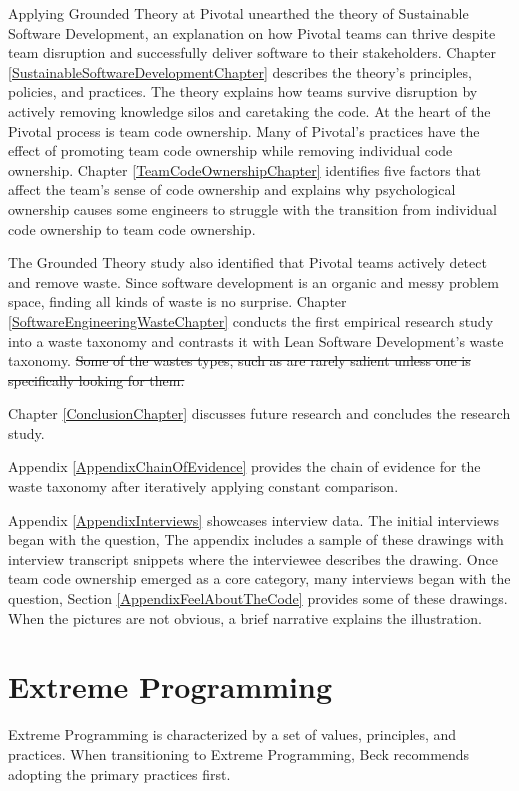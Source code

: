 Applying Grounded Theory at Pivotal unearthed the theory of Sustainable Software Development, an explanation on how Pivotal teams can thrive despite team disruption and successfully deliver software to their stakeholders. Chapter \ref{SustainableSoftwareDevelopmentChapter} describes the theory’s principles, policies, and practices. The theory explains how teams survive disruption by actively removing knowledge silos and caretaking the code. At the heart of the Pivotal process is team code ownership. Many of Pivotal’s practices have the effect of promoting team code ownership while removing individual code ownership. Chapter \ref{TeamCodeOwnershipChapter} identifies five factors that affect the team’s sense of code ownership and explains why psychological ownership causes some engineers to struggle with the transition from individual code ownership to team code ownership. 


The Grounded Theory study also identified that Pivotal teams actively detect and remove waste. Since software development is an organic and messy problem space, finding all kinds of waste is no surprise. Chapter \ref{SoftwareEngineeringWasteChapter} conducts the first empirical research study into a waste taxonomy and contrasts it with Lean Software Development’s waste taxonomy. \sout{Some of the wastes types, such as  are rarely salient unless one is specifically looking for them.}


Chapter \ref{ConclusionChapter} discusses future research and concludes the research study. 


Appendix \ref{AppendixChainOfEvidence} provides the chain of evidence for the waste taxonomy after iteratively applying constant comparison. 


Appendix \ref{AppendixInterviews} showcases interview data. The initial interviews began with the question,  The appendix includes a sample of these drawings with interview transcript snippets where the interviewee describes the drawing. Once team code ownership emerged as a core category, many interviews began with the question,  Section \ref{AppendixFeelAboutTheCode} provides some of these drawings. When the pictures are not obvious, a brief narrative explains the illustration.




\chapter{Extreme Programming}
Extreme Programming is characterized by a set of values, principles, and practices. When transitioning to Extreme Programming, Beck recommends adopting the primary practices first. 
